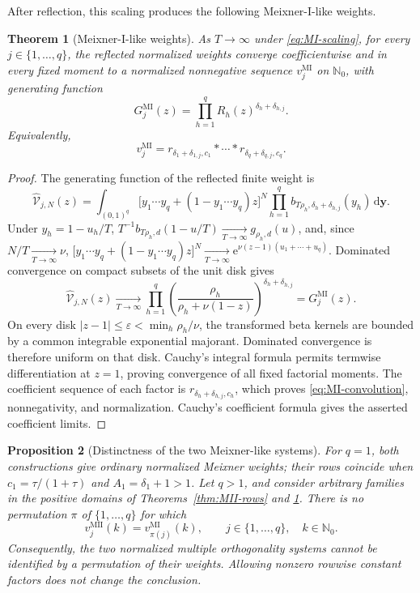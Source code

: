 \documentclass[10pt]{amsart}
\newcommand{\Nzero}{\mathbb N_0}
\newcommand{\e}{\mathrm e}
\newcommand{\dd}{\,\mathrm d}
\newcommand{\abs}[1]{\lvert#1\rvert}
\theoremstyle{plain}
\newtheorem{theorem}{Theorem}[section]
\newtheorem{proposition}[theorem]{Proposition}
\theoremstyle{definition}
\theoremstyle{remark}
\begin{document}
After reflection, this scaling produces the following Meixner-I-like
weights.

\begin{theorem}[Meixner-I-like weights]
\label{thm:MI-rows}
As \(T\to\infty\) under \eqref{eq:MI-scaling}, for every
\(j\in\{1,\ldots,q\}\), the reflected normalized weights converge
coefficientwise and in every fixed moment to a normalized nonnegative
sequence \(v_j^{\mathrm{MI}}\) on \(\Nzero\), with generating function
\begin{equation}
 G_j^{\mathrm{MI}}(z)
 =\prod_{h=1}^qR_h(z)^{\delta_h+\delta_{h,j}}.
 \label{eq:MI-row-pgf}
\end{equation}
Equivalently,
\begin{equation}
 v_j^{\mathrm{MI}}
 =r_{\delta_1+\delta_{1,j},c_1}*\cdots
  *r_{\delta_q+\delta_{q,j},c_q}.
 \label{eq:MI-convolution}
\end{equation}
\end{theorem}

\begin{proof}
The generating function of the reflected finite weight is
\[
 \widehat{\mathcal V}_{j,N}(z)
 =\int_{(0,1)^q}
 \bigl[y_1\cdots y_q+(1-y_1\cdots y_q)z\bigr]^N
 \prod_{h=1}^qb_{T\rho_h,\delta_h+\delta_{h,j}}(y_h)
 \dd\boldsymbol y.
\]
Under \(y_h=1-u_h/T\),
\(T^{-1}b_{T\rho_h,d}(1-u/T)
\xrightarrow[T\to\infty]{}g_{\rho_h,d}(u)\),
and, since \(N/T\xrightarrow[T\to\infty]{}\nu\),
\(\bigl[y_1\cdots y_q+(1-y_1\cdots y_q)z\bigr]^N
\xrightarrow[T\to\infty]{} \e^{\nu(z-1)(u_1+\cdots+u_q)}\).
Dominated convergence on compact subsets of the unit disk gives
\[
 \widehat{\mathcal V}_{j,N}(z)\xrightarrow[T\to\infty]{}
 \prod_{h=1}^q
 \left(\frac{\rho_h}{\rho_h+\nu(1-z)}\right)^{
 \delta_h+\delta_{h,j}}
 =G_j^{\mathrm{MI}}(z).
\]
On every disk
\(\abs{z-1}\le\varepsilon<\min_h\rho_h/\nu\), the transformed beta
kernels are bounded by a common integrable exponential majorant.
Dominated convergence is therefore uniform on that disk.  Cauchy's
integral formula permits termwise differentiation at \(z=1\), proving
convergence of all fixed factorial moments. The
coefficient sequence of each factor is
\(r_{\delta_h+\delta_{h,j},c_h}\), which proves
\eqref{eq:MI-convolution}, nonnegativity, and normalization. Cauchy's
coefficient formula gives the asserted coefficient limits.
\end{proof}

\begin{proposition}[Distinctness of the two Meixner-like systems]
\label{prop:Meixner-families-distinct}
For \(q=1\), both constructions give ordinary normalized Meixner weights;
their rows coincide when \(c_1=\tau/(1+\tau)\) and
\(A_1=\delta_1+1>1\). Let \(q>1\), and consider arbitrary families in the
positive domains of Theorems~\ref{thm:MII-rows} and \ref{thm:MI-rows}.
There is no permutation \(\pi\) of \(\{1,\ldots,q\}\) for which
\[
 v_j^{\mathrm{MII}}(k)=v_{\pi(j)}^{\mathrm{MI}}(k),
 \qquad j\in\{1,\ldots,q\},\quad k\in\Nzero.
\]
Consequently, the two normalized multiple orthogonality systems cannot be
identified by a permutation of their weights. Allowing nonzero rowwise
constant factors does not change the conclusion.
\end{proposition}
\end{document}
